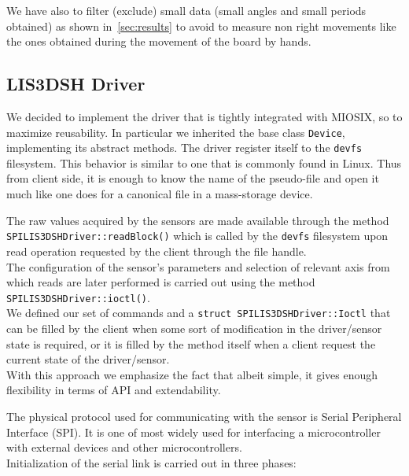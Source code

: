 We have also to filter (exclude) small data (small angles and small periods obtained) as shown in~\ref{sec:results} to avoid to measure non right movements like the ones obtained during the movement of the board by hands.

\subsection{LIS3DSH Driver}
We decided to implement the driver that is tightly integrated with MIOSIX, so to maximize reusability. In particular we inherited the base class \texttt{Device}, implementing its abstract methods. The driver register itself to the \texttt{devfs} filesystem. This behavior is similar to one that is commonly found in Linux. Thus from client side, it is enough to know the name of the pseudo-file and open it much like one does for a canonical file in a mass-storage device.  \par The raw values acquired by the sensors are made available through the method \\ \texttt{SPILIS3DSHDriver::readBlock()} which is called by the \texttt{devfs} filesystem upon read operation requested by the client through the file handle. \\
The configuration of the sensor's parameters and selection of relevant axis from which reads are later performed is carried out using the method \texttt{SPILIS3DSHDriver::ioctl()}. \\ We defined our set of commands and a \texttt{struct SPILIS3DSHDriver::Ioctl} that can be filled by the client when some sort of modification in the driver/sensor state is required, or it is filled by the method itself when a client request the current state of the driver/sensor. \\ With this approach we emphasize the fact that albeit simple, it gives enough flexibility in terms of API and extendability.
\par
The physical protocol used for communicating with the sensor is Serial Peripheral Interface \cite{accelerometerDatasheet}\cite{STM32F4RefMan}  (SPI). It is one of most widely used for interfacing a microcontroller with external devices and other microcontrollers. \\  
Initialization of the serial link is carried out in three phases:
